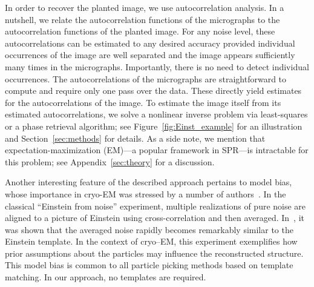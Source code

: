 \documentclass[english,11pt]{article}
\newcommand{\1}{\mathbf{1}}
\newcommand{\TODO}[1]{{\color{red}{[#1]}}}
\numberwithin{equation}{section}
\theoremstyle{plain}
\theoremstyle{definition}
\theoremstyle{remark}
\theoremstyle{plain}
\theoremstyle{remark}
\theoremstyle{plain}
\theoremstyle{plain}
\begin{document}
In order to recover the planted image, we use autocorrelation analysis. In a nutshell, we relate the autocorrelation functions of the micrographs to the autocorrelation functions of the planted image.
For any noise level, these autocorrelations can be estimated to any desired accuracy provided individual occurrences of the image are well separated and the image appears sufficiently many times in the micrographs. Importantly, there is no need to detect individual occurrences. The autocorrelations of the micrographs are straightforward to compute and require only one pass over the data. These directly yield estimates for the autocorrelations of the image. To estimate the image itself from its estimated autocorrelations, we solve a nonlinear inverse problem via least-squares or a phase retrieval algorithm; see Figure~\ref{fig:Einst_example} for an illustration and Section~\ref{sec:methods} for details. As a side note, we mention that expectation-maximization (EM)---a popular framework in SPR---is intractable for this problem; see Appendix~\ref{sec:theory} for a discussion.

Another interesting feature of the described approach pertains to model bias, whose importance in cryo-EM was stressed by a number of authors~\cite{vanheel1992correlation,shatsky2009method,henderson2013avoiding,vanheel2013finding}. In the classical ``Einstein from noise'' experiment, multiple realizations of pure noise are aligned to a picture of Einstein using cross-correlation and then averaged. In~\cite{shatsky2009method}, it was shown that the averaged noise rapidly becomes remarkably similar to the Einstein template. In the context of cryo--EM, this experiment exemplifies how prior assumptions about the particles may influence the reconstructed structure. This model bias is common to all particle picking methods based on template matching. In our approach, no templates are required.




\clearpage



\end{document}

